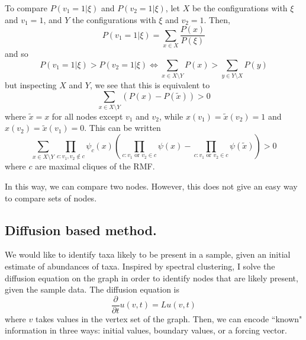 \documentclass[10pt]{article}
\theoremstyle{definition}
\numberwithin{theorem}{section}
\numberwithin{definition}{section}
\numberwithin{lemma}{section}
\numberwithin{corollary}{section}
\numberwithin{clm}{section}
\numberwithin{rmk}{section}
\begin{document}
To compare $P(v_1 =1 | \xi)$ and $P(v_2 = 1 | \xi)$, let $X$ be the configurations with $\xi$ and $v_1 = 1$, and $Y$ the configurations with $\xi$ and $v_2 = 1$. Then,
\[
P(v_1 = 1| \xi) = \sum_{x\in X} \frac{P(x)}{P(\xi)}
\]
and so
\[
P(v_1 = 1| \xi) > P(v_2 = 1|\xi) \Leftrightarrow \sum_{x\in X\setminus Y} P(x) >\sum_{y \in Y\setminus X} P(y)
\]
but inspecting $X$ and $Y$, we see that this is equivalent to 
\[
\sum_{x\in X\setminus Y} (P(x) - P(\tilde{x})) > 0
\]
where $\tilde{x} = x$ for all nodes except $v_1$ and $v_2$, while $x(v_1) = \tilde{x}(v_2) = 1$ and $x(v_2) = \tilde{x}(v_1) = 0$. This can be written
\begin{equation}
\sum_{x\in X\setminus Y}\prod_{c:v_1,v_2 \not \in c}\psi_c(x)\left(\prod_{c:v_1\text{ or }v_2  \in c}\psi(x) - \prod_{c:v_1\text{ or }v_2  \in c}\psi(\tilde{x}) \right) >0
\end{equation}
where $c$ are maximal cliques of the RMF.

In this way, we can compare two nodes. However, this does not give an easy way to compare sets of nodes.

\subsection{Diffusion based method.}
We would like to identify taxa likely to be present in a sample, given an initial estimate of abundances of taxa. Inspired by spectral clustering, I solve the diffusion equation on the graph in order to identify nodes that are likely present, given the sample data. The diffusion equation is
\[
\frac{\partial}{\partial t} u(v,t) = L u(v,t)
\]
where $v$ takes values in the vertex set of the graph. Then, we can encode ``known" information in three ways: initial values, boundary values, or a forcing vector.
\end{document}

